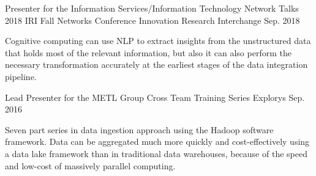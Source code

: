 \begin{cventries}
  \cventry
    {Presenter for the Information Services/Information Technology Network Talks} %
    {2018 IRI Fall Networks Conference} %
    {Innovation Research Interchange} %
    {Sep. 2018} %
    {
      \begin{cvcompactparagraph}
        Cognitive computing can use NLP to extract insights from the unstructured data that holds most of the relevant information, but also it can also perform the necessary transformation accurately at the earliest stages of the data integration pipeline.
      \end{cvcompactparagraph}
    }


  \cventry
    {Lead Presenter for the METL Group} %
    {Cross Team Training Series} %
    {Explorys} %
    {Sep. 2016} %
    {
      \begin{cvcompactparagraph}
        Seven part series in data ingestion approach using the Hadoop software framework.  Data can be aggregated much more quickly and cost-effectively using a data lake framework than in traditional data warehouses, because of the speed and low-cost of massively parallel computing.
      \end{cvcompactparagraph}
    }

\end{cventries}
